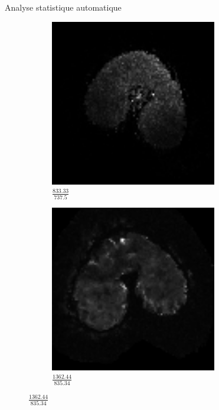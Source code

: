 \documentclass[10pt]{beamer}
\begin{document}
\begin{frame}{Analyse statistique automatique}
\begin{figure}
\begin{subfigure}[c]{0.33\textwidth}
      \label{subfig:manualcorr_irm650_t2}
    \end{subfigure}
    \begin{subfigure}[c]{0.33\textwidth}
      \centering
      \includegraphics[width=0.8\textwidth]{fig/autocorr_msi_250}
      \caption{$\frac{833.33}{737.5}$}
      \label{subfig:autocorr_msi_250}
    \end{subfigure}%
    \begin{subfigure}[c]{0.33\textwidth}
      \centering
      \includegraphics[width=0.8\textwidth]{fig/autocorr_msi_650}
      \caption{$\frac{1362.44}{835.34}$}
      \label{subfig:autocorr_msi_650}
    \end{subfigure}
  \end{figure}
  
\end{frame}
\end{document}
